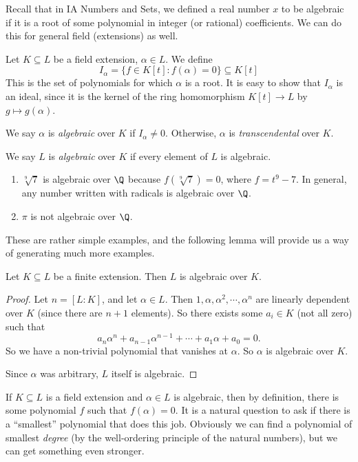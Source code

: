 \documentclass[a4paper]{article}
\begin{document}
Recall that in IA Numbers and Sets, we defined a real number $x$ to be algebraic if it is a root of some polynomial in integer (or rational) coefficients. We can do this for general field (extensions) as well.
\begin{defi}
  Let $K\subseteq L$ be a field extension, $\alpha\in L$. We define
  \[
    I_\alpha = \{f\in K[t] : f(\alpha) = 0\}\subseteq K[t]
  \]
  This is the set of polynomials for which $\alpha$ is a root. It is easy to show that $I_\alpha$ is an ideal, since it is the kernel of the ring homomorphism $K[t] \to L$ by $g \mapsto g(\alpha)$.

  We say $\alpha$ is \emph{algebraic} over $K$ if $I_\alpha \not= 0$. Otherwise, $\alpha$ is \emph{transcendental} over $K$.

  We say $L$ is \emph{algebraic} over $K$ if every element of $L$ is algebraic.
\end{defi}

\begin{eg}\leavevmode
  \begin{enumerate}
    \item $\sqrt[9]{7}$ is algebraic over $\Q$ because $f(\sqrt[9]{7}) = 0$, where $f = t^9 - 7$. In general, any number written with radicals is algebraic over $\Q$.
    \item $\pi$ is not algebraic over $\Q$.
  \end{enumerate}
\end{eg}
These are rather simple examples, and the following lemma will provide us a way of generating much more examples.

\begin{lemma}
  Let $K\subseteq L$ be a finite extension. Then $L$ is algebraic over $K$.
\end{lemma}

\begin{proof}
  Let $n = [L:K]$, and let $\alpha\in L$. Then $1, \alpha, \alpha^2, \cdots, \alpha^n$ are linearly dependent over $K$ (since there are $n + 1$ elements). So there exists some $a_i \in K$ (not all zero) such that
  \[
    a_n \alpha^n + a_{n - 1}\alpha^{n - 1} + \cdots + a_1 \alpha + a_0 = 0.
  \]
  So we have a non-trivial polynomial that vanishes at $\alpha$. So $\alpha$ is algebraic over $K$.

  Since $\alpha$ was arbitrary, $L$ itself is algebraic.
\end{proof}

If $K\subseteq L$ is a field extension and $\alpha \in L$ is algebraic, then by definition, there is some polynomial $f$ such that $f(\alpha) = 0$. It is a natural question to ask if there is a ``smallest'' polynomial that does this job. Obviously we can find a polynomial of smallest \emph{degree} (by the well-ordering principle of the natural numbers), but we can get something even stronger.
\end{document}
